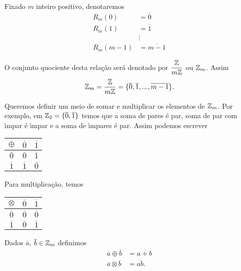 \begin{observacao}
Fixado $m$ inteiro positivo, denotaremos
\begin{align*}
	R_{m}(0) &= \overline{0}\\
	R_{m}(1) &= \overline{1}\\
	&\vdots\\
	R_{m}(m-1) &= \overline{m-1}
\end{align*}

O conjunto quociente desta rela{\c c}{\~a}o ser{\'a} denotado por $\displaystyle\frac{\mathbb{Z}}{m\mathbb{Z}}$ ou $\mathbb{Z}_m$. Assim
\[
	\mathbb{Z}_m = \displaystyle\frac{\mathbb{Z}}{m\mathbb{Z}}=\{\overline{0},\overline{1},...,\overline{m-1}\}.
\]
\end{observacao}

Queremos definir um meio de somar e multiplicar os elementos de $\mathbb{Z}_m$. Por exemplo, em $\mathbb{Z}_2 = \{\overline{0},\overline{1}\}$ temos que a soma de pares {\'e} par, soma de par com {\'\i}mpar {\'e} {\'\i}mpar e a soma de {\'\i}mpares {\'e} par. Assim podemos escrever

\begin{table}[h]
   \centering 
   \setlength{\arrayrulewidth}{0,5\arrayrulewidth}
   \begin{tabular}{|c|c|c|} 
      \hline
      $\oplus$ & $\overline{0}$ & $\overline{1}$ \T\\
      \hline
      $\overline{0}$ & $\overline{0}$ & $\overline{1}$\T\\
      \hline
      $\overline{1}$ & $\overline{1}$ & $\overline{0}$\T\\
      \hline
   \end{tabular}
\end{table}

Para multiplica{\c c}{\~a}o, temos

\begin{table}[h]
   \centering 
   \setlength{\arrayrulewidth}{0,5\arrayrulewidth}
   \begin{tabular}{|c|c|c|} 
      \hline
      $\otimes$ & $\overline{0}$ & $\overline{1}$\T\\
      \hline
      $\overline{0}$ & $\overline{0}$ & $\overline{0}$\T\\
      \hline
      $\overline{1}$ & $\overline{0}$ & $\overline{1}$\T\\
      \hline
   \end{tabular}
\end{table}

\begin{definicao}
	Dados $\overline{a}$, $\overline{b} \in \mathbb{Z}_m$ definimos
	\begin{align}
		\overline{a}\oplus\overline{b} &= \overline{a + b}\label{soma_modulo_m}\\
		\overline{a}\otimes\overline{b} &= \overline{ab}.\label{multiplicacao_modulo_m}
	\end{align}
\end{definicao}

